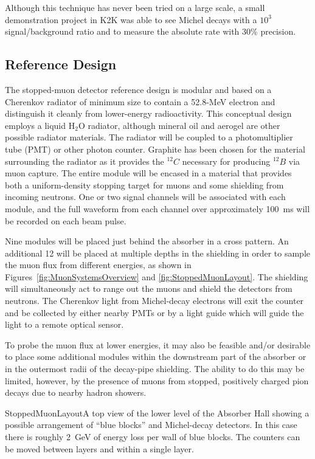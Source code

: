Although this technique has never been tried on a large scale, a small
demonstration project in K2K was able to see Michel decays with a
$10^{3}$ signal/background ratio and to measure the absolute rate with
30\% precision\cite{ref:K2KMuDecayMon}.

\subsection{Reference Design}

The stopped-muon detector reference design
is modular and based on a Cherenkov radiator of
minimum size to contain a 52.8-MeV electron and distinguish it cleanly
from lower-energy radioactivity. This conceptual design employs
a liquid H$_2$O radiator, although mineral oil and aerogel are other
possible radiator materials. The radiator will be coupled to a photomultiplier tube (PMT) or
other photon counter. Graphite has been chosen for the material
surrounding the radiator as it provides the $^{12}C$ necessary for
producing $^{12}B$ via muon capture. The entire module will be
encased in a material that provides both a uniform-density stopping
target for muons and some shielding from incoming neutrons. One or two
signal channels will be associated with each module, and the full
waveform from each channel over approximately 100~ms will be recorded
on each beam pulse.

Nine modules will be placed just behind the absorber in a cross pattern.  An additional 12 will be 
placed at multiple depths in the
shielding in order to sample the muon flux
from different energies, as shown in Figures~\ref{fig:MuonSystemsOverview} and \ref{fig:StoppedMuonLayout}. 
The shielding will simultaneously act to range out the muons and shield the detectors from 
neutrons. The Cherenkov light from Michel-decay electrons will exit the 
counter and be collected by either nearby PMTs or by a light guide which will
guide the light to a remote optical sensor.  

To probe the muon flux at lower energies, it may also
be feasible and/or desirable to place some additional modules within
the downstream part of the absorber or in the outermost radii of the
decay-pipe shielding. The ability to do this may be limited, however,
by the presence of muons from stopped, positively charged pion decays
due to nearby hadron showers.


\begin{cdrfigure}{StoppedMuonLayout}{A top view of the 
lower level of the Absorber Hall showing a possible arrangement of ``blue blocks'' 
and Michel-decay detectors. In this case there is roughly 2~GeV of energy loss 
per wall of blue blocks. The counters can be moved between layers and within a single layer.}
\end{cdrfigure}

